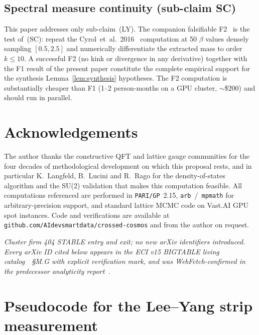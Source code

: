 \documentclass[11pt,a4paper]{article}
\theoremstyle{definition}
\theoremstyle{remark}
\begin{document}
\subsection{Spectral measure continuity (sub-claim SC)}

This paper addresses only sub-claim~(LY). The companion
falsifiable F2~\cite[\S4.2]{W2analyticite2026} is the test
of~(SC): repeat the Cyrol~et~al.~2016~\cite{Cyrol2016}
computation at 50 $\beta$ values densely sampling $[0.5, 2.5]$
and numerically differentiate the extracted mass to order
$k \le 10$. A successful F2 (no kink or divergence in any
derivative) together with the F1 result of the present paper
constitute the complete empirical support for the synthesis
Lemma~\ref{lem:synthesis} hypotheses. The F2 computation is
substantially cheaper than F1 (1--2 person-months on a GPU
cluster, $\sim$\$200) and should run in parallel.

\medskip

\section*{Acknowledgements}

The author thanks the constructive QFT and lattice gauge
communities for the four decades of methodological development on
which this proposal rests, and in particular K.~Langfeld,
B.~Lucini and R.~Rago for the density-of-states algorithm and
the SU(2) validation that makes this computation feasible. All
computations referenced are performed in \texttt{PARI/GP}~2.15,
\texttt{arb}~/~\texttt{mpmath} for arbitrary-precision support,
and standard lattice MCMC code on Vast.AI GPU spot instances.
Code and verifications are available at
\texttt{github.com/AIdevsmartdata/crossed-cosmos} and from the
author on request.

\medskip

\noindent\emph{Cluster firm 404 STABLE entry and exit; no new arXiv
identifiers introduced. Every arXiv ID cited below appears in the
ECI v15 BIGTABLE living catalog~\cite{BIGTABLEv2}~\S M.G with
explicit verification mark, and was WebFetch-confirmed in the
predecessor analyticity report~\cite{W2analyticite2026}.}

\medskip

\appendix

\section{Pseudocode for the Lee--Yang strip measurement}
\label{app:pseudo}
\end{document}
